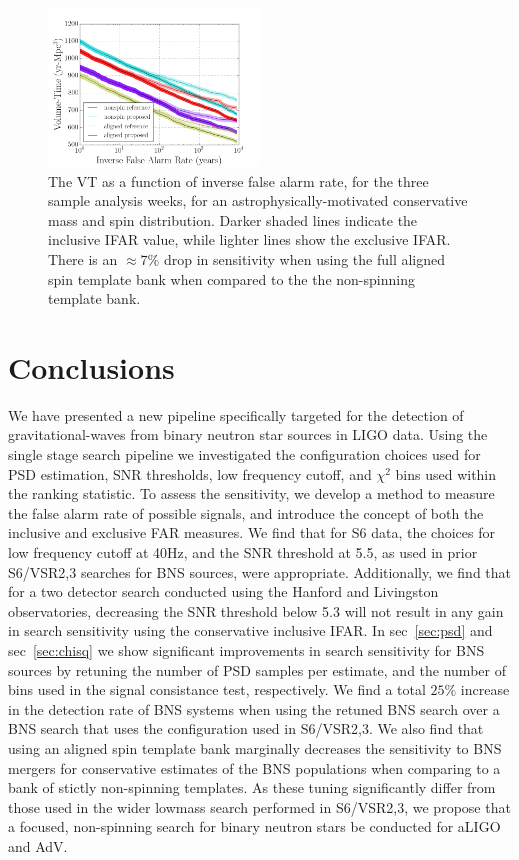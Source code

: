 \begin{figure}
\centering
\includegraphics[width=0.5\textwidth]{papers/bns_o1_dev/figures/rest_combined.png}
\caption{\label{fig:rest} 
The VT as a function of inverse false alarm rate, for the
three sample analysis weeks, for an astrophysically-motivated conservative mass and spin distribution. Darker shaded lines indicate the inclusive IFAR value, while lighter lines show the exclusive IFAR. There is an $\approx 7\%$ drop in sensitivity when using the full aligned spin template bank when compared to the the non-spinning
template bank.}
\end{figure}

\section{Conclusions}

We have presented a new pipeline specifically targeted for the detection of gravitational-waves from binary neutron star sources in LIGO data. Using the single stage search pipeline we investigated the configuration choices used for PSD estimation, SNR thresholds, low frequency cutoff, and $\chi^2$ bins used within the ranking statistic. To assess the sensitivity, we develop a method to measure the false alarm rate of possible signals, and introduce the concept of both the inclusive and exclusive FAR measures. We find that for S6 data, the choices for low frequency cutoff at 40Hz, and the SNR threshold at 5.5, as used in prior S6/VSR2,3 searches for BNS sources, were appropriate. Additionally, we find that for a two detector search conducted using the Hanford and Livingston observatories, decreasing the SNR threshold below 5.3 will not result in any gain in search sensitivity using the conservative inclusive IFAR. In sec~\ref{sec:psd} and sec~\ref{sec:chisq} we show significant improvements in search sensitivity for BNS sources by retuning the number of PSD samples per estimate, and the number of bins used in the signal consistance test, respectively. We find a total $25\%$ increase in the detection rate of BNS systems when using the retuned BNS search over a BNS search that uses the configuration used in S6/VSR2,3. We also find that using an aligned spin template bank marginally decreases the sensitivity 
to BNS mergers for conservative estimates of the BNS populations when comparing to a bank of stictly non-spinning templates. As these tuning significantly differ from those used in the wider lowmass search performed in S6/VSR2,3, we propose that a focused, non-spinning search for binary neutron stars be conducted for aLIGO and AdV.

\label{sec:conclusions}
